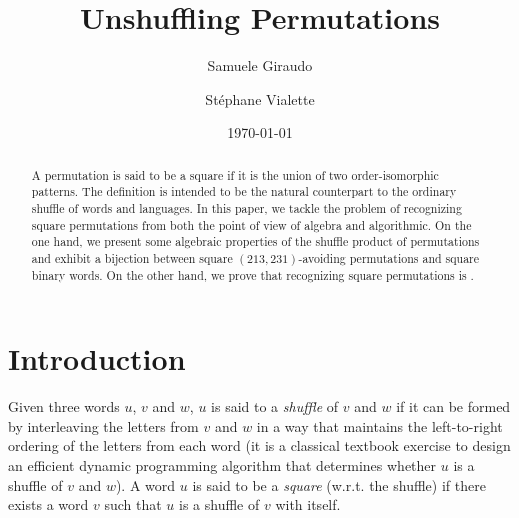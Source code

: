 \documentclass[a4paper]{llncs}
\begin{document}

\title{%
Unshuffling Permutations}%

\author{%
  Samuele Giraudo \and
  St\'ephane Vialette
}%
\date{\today}

\maketitle


\begin{abstract}
    A permutation is said to be a square if it is the union of two
    order-isomorphic patterns. The definition is intended to be the
    natural counterpart to the ordinary shuffle of words and languages.
    In this paper, we tackle the problem of recognizing square
    permutations from both the point of view of algebra and algorithmic.
    On the one hand, we present some algebraic properties of the shuffle
    product of permutations and exhibit a bijection between square
    $(213,231)$-avoiding permutations and square binary words. On the
    other hand, we prove that recognizing square permutations is \NPC.
\end{abstract}


\section{Introduction}
\label{section:Introduction}

Given three words $u$, $v$ and $w$, $u$ is said to a \emph{shuffle} of
$v$ and $w$ if it can be formed by interleaving the letters from $v$ and
$w$ in a way that maintains the left-to-right ordering of the letters
from each word (it is a classical textbook exercise to design an
efficient dynamic programming algorithm that determines whether $u$ is a
shuffle of $v$ and $w$). A word $u$ is said to be a \emph{square} (w.r.t.
the shuffle) if there exists a word $v$ such that $u$ is a shuffle of $v$
with itself.
\smallskip
\end{document}
